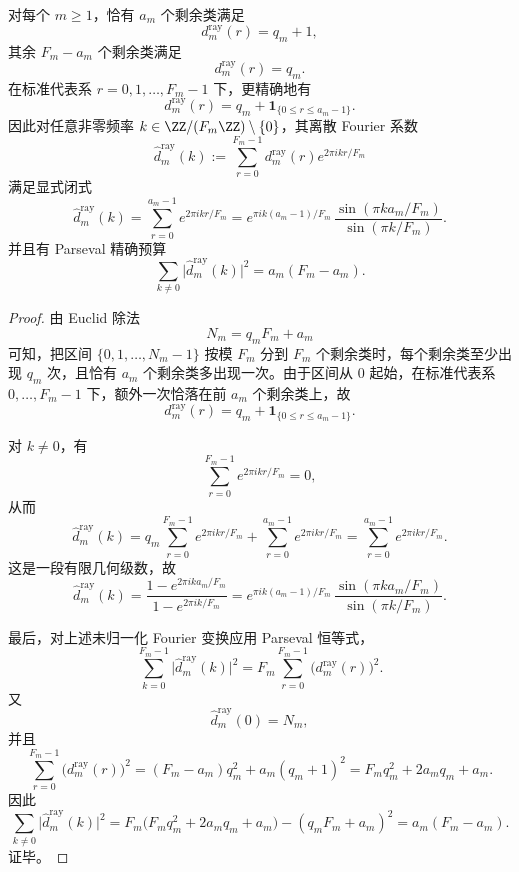\begin{theorem}\label{thm:conclusion-serrin-wulff-ray-two-level-fourier-closed}
对每个 \(m\ge 1\)，恰有 \(a_m\) 个剩余类满足
\[
d_m^{\mathrm{ray}}(r)=q_m+1,
\]
其余 \(F_m-a_m\) 个剩余类满足
\[
d_m^{\mathrm{ray}}(r)=q_m.
\]
在标准代表系 \(r=0,1,\dots,F_m-1\) 下，更精确地有
\[
d_m^{\mathrm{ray}}(r)=q_m+\mathbf 1_{\{0\le r\le a_m-1\}}.
\]
因此对任意非零频率 \(k\in \ZZ/(F_m\ZZ)\setminus\{0\}\)，其离散 Fourier 系数
\[
\widehat d_m^{\mathrm{ray}}(k)
:=
\sum_{r=0}^{F_m-1}d_m^{\mathrm{ray}}(r)e^{2\pi i kr/F_m}
\]
满足显式闭式
\[
\widehat d_m^{\mathrm{ray}}(k)
=
\sum_{r=0}^{a_m-1}e^{2\pi i kr/F_m}
=
e^{\pi i k(a_m-1)/F_m}\,
\frac{\sin(\pi k a_m/F_m)}{\sin(\pi k/F_m)}.
\]
并且有 Parseval 精确预算
\[
\sum_{k\neq 0}\bigl|\widehat d_m^{\mathrm{ray}}(k)\bigr|^2
=
a_m(F_m-a_m).
\]
\end{theorem}
\begin{proof}
由 Euclid 除法
\[
N_m=q_mF_m+a_m
\]
可知，把区间 \(\{0,1,\dots,N_m-1\}\) 按模 \(F_m\) 分到 \(F_m\) 个剩余类时，每个剩余类至少出现 \(q_m\) 次，且恰有 \(a_m\) 个剩余类多出现一次。由于区间从 \(0\) 起始，在标准代表系 \(0,\dots,F_m-1\) 下，额外一次恰落在前 \(a_m\) 个剩余类上，故
\[
d_m^{\mathrm{ray}}(r)=q_m+\mathbf 1_{\{0\le r\le a_m-1\}}.
\]

对 \(k\neq 0\)，有
\[
\sum_{r=0}^{F_m-1}e^{2\pi i kr/F_m}=0,
\]
从而
\[
\widehat d_m^{\mathrm{ray}}(k)
=
q_m\sum_{r=0}^{F_m-1}e^{2\pi i kr/F_m}
+\sum_{r=0}^{a_m-1}e^{2\pi i kr/F_m}
=
\sum_{r=0}^{a_m-1}e^{2\pi i kr/F_m}.
\]
这是一段有限几何级数，故
\[
\widehat d_m^{\mathrm{ray}}(k)
=
\frac{1-e^{2\pi i k a_m/F_m}}{1-e^{2\pi i k/F_m}}
=
e^{\pi i k(a_m-1)/F_m}\,
\frac{\sin(\pi k a_m/F_m)}{\sin(\pi k/F_m)}.
\]

最后，对上述未归一化 Fourier 变换应用 Parseval 恒等式，
\[
\sum_{k=0}^{F_m-1}\bigl|\widehat d_m^{\mathrm{ray}}(k)\bigr|^2
=
F_m\sum_{r=0}^{F_m-1}\bigl(d_m^{\mathrm{ray}}(r)\bigr)^2.
\]
又
\[
\widehat d_m^{\mathrm{ray}}(0)=N_m,
\]
并且
\[
\sum_{r=0}^{F_m-1}\bigl(d_m^{\mathrm{ray}}(r)\bigr)^2
=
(F_m-a_m)q_m^2+a_m(q_m+1)^2
=
F_mq_m^2+2a_mq_m+a_m.
\]
因此
\[
\sum_{k\neq 0}\bigl|\widehat d_m^{\mathrm{ray}}(k)\bigr|^2
=
F_m\bigl(F_mq_m^2+2a_mq_m+a_m\bigr)-(q_mF_m+a_m)^2
=
a_m(F_m-a_m).
\]
证毕。
\end{proof}

